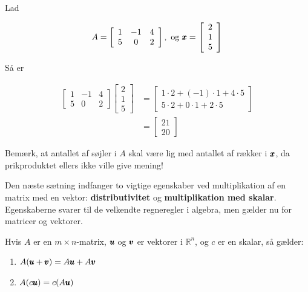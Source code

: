 \begin{example} Lad

\[
A=\left[\begin{array}{ccc}
1 & -1 & 4 \\
5 & 0 & 2
\end{array}\right], \text { og } \pmb{x}=\left[\begin{array}{l}
2 \\
1 \\
5
\end{array}\right]
\]

Så er

\[
\begin{aligned}
{\left[\begin{array}{ccc}
1 & -1 & 4 \\
5 & 0 & 2
\end{array}\right]\left[\begin{array}{l}
2 \\
1 \\
5
\end{array}\right] } & =\left[\begin{array}{c}
1 \cdot 2+(-1) \cdot 1+4 \cdot 5 \\
5 \cdot 2+0 \cdot 1+2 \cdot 5
\end{array}\right] \\
& =\left[\begin{array}{c}
21 \\
20
\end{array}\right]
\end{aligned}
\]
\end{example}

Bemærk, at antallet af søjler i $A$ skal være lig med antallet af rækker i $\pmb{x}$, da prikproduktet ellers ikke ville give mening!

Den næste sætning indfanger to vigtige egenskaber ved multiplikation af en matrix med en vektor: \textbf{distributivitet} og \textbf{multiplikation med skalar}. Egenskaberne svarer til de velkendte regneregler i algebra, men gælder nu for matricer og vektorer.

\begin{theorem}
Hvis \( A \) er en \( m \times n \)-matrix, \( \pmb{u} \) og \( \pmb{v} \) er vektorer i \( \mathbb{R}^n \), og \( c \) er en skalar, så gælder:

\begin{enumerate}[label=(\alph*)]
    \item \( A(\pmb{u} + \pmb{v}) = A \pmb{u} + A \pmb{v} \)  


    \item \( A(c \pmb{u}) = c(A \pmb{u}) \)  

\end{enumerate}
\end{theorem}

